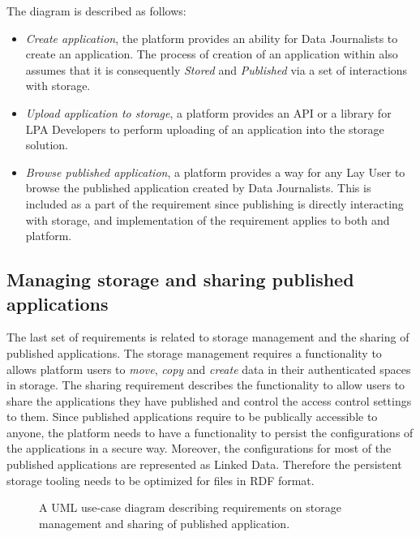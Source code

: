 The diagram is described as follows:
\begin{itemize}
    \item \textit{Create application}, the platform provides an ability for Data Journalists to create an application. The process of creation of an application within \lpa{} also assumes that it is consequently \textit{Stored} and \textit{Published} via a set of interactions with storage.
    \item \textit{Upload application to storage}, a platform provides an API or a library for LPA Developers to perform uploading of an application into the storage solution.
    \item \textit{Browse published application}, a platform provides a way for any Lay User to browse the published application created by Data Journalists. This is included as a part of the requirement since publishing is directly interacting with storage, and implementation of the requirement applies to both \lpas{} and \lpa{} platform.
\end{itemize}


\subsection{Managing storage and sharing published applications}

The last set of requirements is related to storage management and the sharing of published applications. The storage management requires a functionality to allows platform users to \textit{move}, \textit{copy} and \textit{create} data in their authenticated spaces in storage. The sharing requirement describes the functionality to allow users to share the applications they have published and control the access control settings to them. Since published applications require to be publically accessible to anyone, the platform needs to have a functionality to persist the configurations of the applications in a secure way. Moreover, the configurations for most of the published applications are represented as Linked Data. Therefore the persistent storage tooling needs to be optimized for files in RDF format.
 
\begin{figure}[h]
\centering
{}
\caption{A UML use-case diagram describing requirements on storage management and sharing of published application.}
\label{fig:lpa_managing_storage}
\end{figure}

